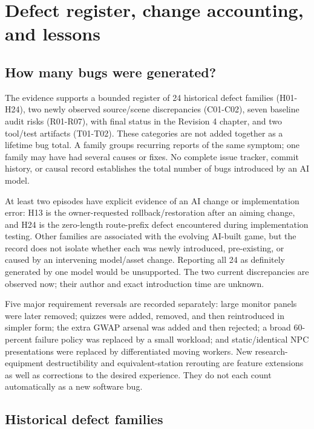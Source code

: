 \chapter{Defect register, change accounting, and lessons}
\section{How many bugs were generated?}
The evidence supports a bounded register of 24 historical defect families (H01-H24), two newly observed source/\allowbreak{}scene discrepancies (C01-C02), seven baseline audit risks (R01-R07), with final status in the Revision 4 chapter, and two tool/\allowbreak{}test artifacts (T01-T02).\allowbreak{} These categories are not added together as a lifetime bug total.\allowbreak{} A family groups recurring reports of the same symptom; one family may have had several causes or fixes.\allowbreak{} No complete issue tracker, commit history, or causal record establishes the total number of bugs introduced by an AI model.\allowbreak{}

At least two episodes have explicit evidence of an AI change or implementation error: H13 is the owner-requested rollback/\allowbreak{}restoration after an aiming change, and H24 is the zero-length route-prefix defect encountered during implementation testing.\allowbreak{} Other families are associated with the evolving AI-built game, but the record does not isolate whether each was newly introduced, pre-existing, or caused by an intervening model/\allowbreak{}asset change.\allowbreak{} Reporting all 24 as definitely generated by one model would be unsupported.\allowbreak{} The two current discrepancies are observed now; their author and exact introduction time are unknown.\allowbreak{}

Five major requirement reversals are recorded separately: large monitor panels were later removed; quizzes were added, removed, and then reintroduced in simpler form; the extra GWAP arsenal was added and then rejected; a broad 60-percent failure policy was replaced by a small workload; and static/\allowbreak{}identical NPC presentations were replaced by differentiated moving workers.\allowbreak{} New research-equipment destructibility and equivalent-station rerouting are feature extensions as well as corrections to the desired experience.\allowbreak{} They do not each count automatically as a new software bug.\allowbreak{}

\section{Historical defect families}
